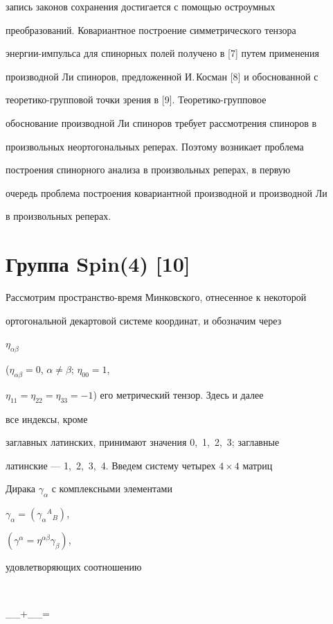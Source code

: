 запись законов сохранения достигается с помощью остроумных


преобразований. Ковариантное построение симметрического тензора


энергии-импульса для спинорных полей получено в [7] путем применения


производной Ли спиноров, предложенной И.\,Косман [8] и обоснованной с


теоретико-групповой точки зрения в [9]. Теоретико-групповое


обоснование производной Ли спиноров требует рассмотрения спиноров в


произвольных неортогональных реперах. Поэтому возникает проблема


построения спинорного анализа в произвольных реперах, в первую


очередь проблема построения ковариантной производной и производной Ли


в произвольных реперах.





\section{Группа Spin(4) [10]}





Рассмотрим пространство-время Минковского, отнесенное к некоторой


ортогональной декартовой системе координат, и обозначим через


$\eta_{\alpha\beta}$


($\eta_{\alpha\beta}=0$, $\alpha\ne\beta$; $\eta_{00}=1$,


$\eta_{11}=\eta_{22}=\eta_{33}=-1$) его метрический тензор. Здесь и далее


все индексы, кроме


заглавных латинских, принимают значения 0,~1,~2,~3; заглавные


латинские --- 1,~2,~3,~4. Введем систему четырех $4\times4$ матриц


Дирака $\gamma_\alpha$ с комплексными элементами


$\gamma_\alpha=(\gamma_\alpha{}^A{}_B)$,


$(\gamma^\alpha=\eta^{\alpha\beta}\gamma_\beta)$,


удовлетворяющих соотношению


$$


\gamma_\alpha\gamma_\beta+\gamma_\beta\gamma_\alpha=


